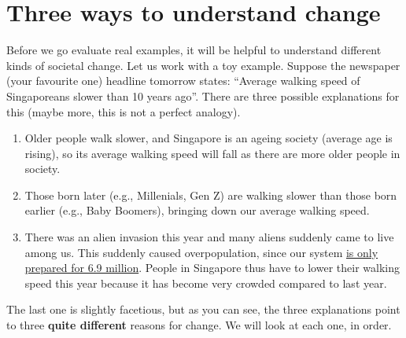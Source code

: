 \documentclass[openany]{book}
\begin{document}
\section{Three ways to understand
change}\label{three-ways-to-understand-change}

Before we go evaluate real examples, it will be helpful to understand
different kinds of societal change. Let us work with a toy example.
Suppose the newspaper (your favourite one) headline tomorrow states:
``Average walking speed of Singaporeans slower than 10 years ago''.
There are three possible explanations for this (maybe more, this is not
a perfect analogy).

\begin{enumerate}
\def\labelenumi{\arabic{enumi}.}
\item
  Older people walk slower, and Singapore is an ageing society (average
  age is rising), so its average walking speed will fall as there are
  more older people in society.
\item
  Those born later (e.g., Millenials, Gen Z) are walking slower than
  those born earlier (e.g., Baby Boomers), bringing down our average
  walking speed.
\item
  There was an alien invasion this year and many aliens suddenly came to
  live among us. This suddenly caused overpopulation, since our system
  \href{https://www.strategygroup.gov.sg/media-centre/population-white-paper-a-sustainable-population-for-a-dynamic-singapore}{is
  only prepared for 6.9 million}. People in Singapore thus have to lower
  their walking speed this year because it has become very crowded
  compared to last year.
\end{enumerate}

The last one is slightly facetious, but as you can see, the three
explanations point to three \textbf{quite different} reasons for change.
We will look at each one, in order.
\end{document}
